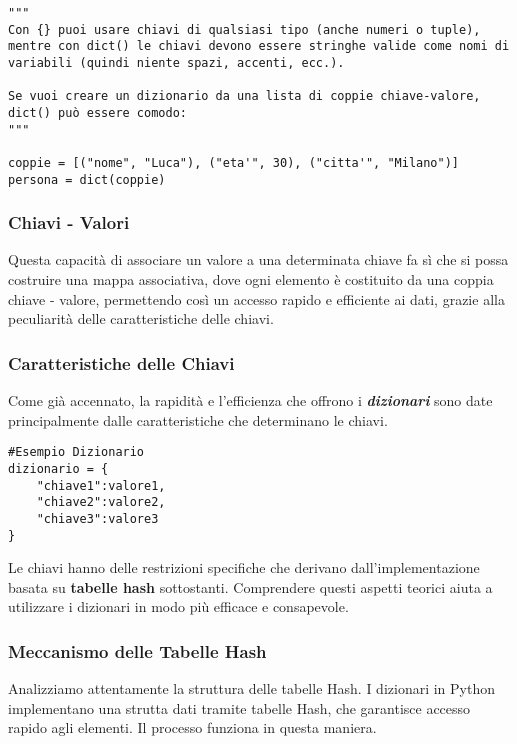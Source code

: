 \vspace{0.5cm}
\begin{lstlisting}
"""
Con {} puoi usare chiavi di qualsiasi tipo (anche numeri o tuple), mentre con dict() le chiavi devono essere stringhe valide come nomi di variabili (quindi niente spazi, accenti, ecc.).

Se vuoi creare un dizionario da una lista di coppie chiave-valore, dict() può essere comodo:
"""

coppie = [("nome", "Luca"), ("eta'", 30), ("citta'", "Milano")]
persona = dict(coppie)

\end{lstlisting}



\subsubsection{Chiavi - Valori}\label{ChiaveValoreDizionari}

Questa capacità di associare un valore a una determinata chiave fa sì che si possa costruire una mappa associativa, dove ogni elemento è costituito da una coppia chiave - valore, permettendo così un accesso rapido e efficiente ai dati, grazie alla peculiarità delle caratteristiche delle chiavi.

\subsubsection{Caratteristiche delle Chiavi}\label{CaratteristicheChiaviDict}
Come già accennato, la rapidità e l'efficienza che offrono i \textit{\textbf{dizionari}} sono date principalmente dalle caratteristiche che determinano le chiavi.


\begin{lstlisting}
#Esempio Dizionario
dizionario = {
    "chiave1":valore1,
    "chiave2":valore2,
    "chiave3":valore3
}
\end{lstlisting}
\vspace{0.5cm}

Le chiavi hanno delle restrizioni specifiche che derivano dall'implementazione basata su \textbf{tabelle hash} sottostanti.
Comprendere questi aspetti teorici aiuta a utilizzare i dizionari in modo più efficace e consapevole.


\subsubsection{Meccanismo delle Tabelle Hash}\label{MeccanismoTabellaHashDict}
Analizziamo attentamente la struttura delle tabelle Hash.
I dizionari in Python implementano una strutta dati tramite tabelle Hash, che garantisce accesso rapido agli elementi. Il processo funziona in questa maniera.
\vspace{0.3cm}

